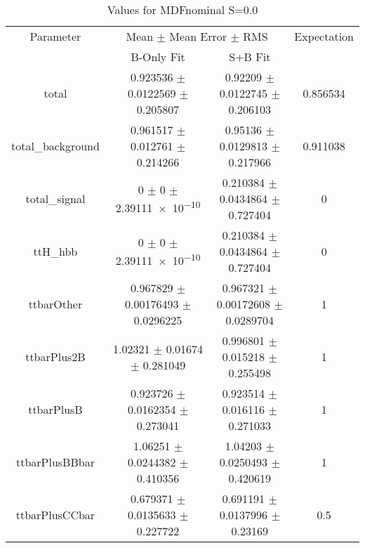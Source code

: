 \begin{table}
\centering
\caption{Values for MDFnominal S=0.0}
\begin{tabular}{cccc}
\toprule
Parameter & \multicolumn{2}{c}{Mean $\pm$ Mean Error $\pm$ RMS} & Expectation\\
 & B-Only Fit & S+B Fit & \\
\midrule
total & \num{0.923536} $\pm$ \num{0.0122569} $\pm$ \num{0.205807} & \num{0.92209} $\pm$ \num{0.0122745} $\pm$ \num{0.206103} & \num{0.856534}\\
total\_background & \num{0.961517} $\pm$ \num{0.012761} $\pm$ \num{0.214266} & \num{0.95136} $\pm$ \num{0.0129813} $\pm$ \num{0.217966} & \num{0.911038}\\
total\_signal & \num{0} $\pm$ \num{0} $\pm$ \num{2.39111e-10} & \num{0.210384} $\pm$ \num{0.0434864} $\pm$ \num{0.727404} & \num{0}\\
ttH\_hbb & \num{0} $\pm$ \num{0} $\pm$ \num{2.39111e-10} & \num{0.210384} $\pm$ \num{0.0434864} $\pm$ \num{0.727404} & \num{0}\\
ttbarOther & \num{0.967829} $\pm$ \num{0.00176493} $\pm$ \num{0.0296225} & \num{0.967321} $\pm$ \num{0.00172608} $\pm$ \num{0.0289704} & \num{1}\\
ttbarPlus2B & \num{1.02321} $\pm$ \num{0.01674} $\pm$ \num{0.281049} & \num{0.996801} $\pm$ \num{0.015218} $\pm$ \num{0.255498} & \num{1}\\
ttbarPlusB & \num{0.923726} $\pm$ \num{0.0162354} $\pm$ \num{0.273041} & \num{0.923514} $\pm$ \num{0.016116} $\pm$ \num{0.271033} & \num{1}\\
ttbarPlusBBbar & \num{1.06251} $\pm$ \num{0.0244382} $\pm$ \num{0.410356} & \num{1.04203} $\pm$ \num{0.0250493} $\pm$ \num{0.420619} & \num{1}\\
ttbarPlusCCbar & \num{0.679371} $\pm$ \num{0.0135633} $\pm$ \num{0.227722} & \num{0.691191} $\pm$ \num{0.0137996} $\pm$ \num{0.23169} & \num{0.5}\\
\bottomrule
\end{tabular}
\end{table}